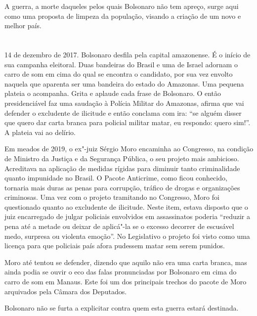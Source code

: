 A guerra, a morte daqueles pelos quais Bolsonaro não tem apreço, surge
aqui como uma proposta de limpeza da população, visando a criação de um
novo e melhor país.

\section*{}

14 de dezembro de 2017. Bolsonaro desfila pela capital amazonense. É o
início de sua campanha eleitoral. Duas bandeiras do Brasil e uma de
Israel adornam o carro de som em cima do qual se encontra o candidato,
por sua vez envolto naquela que aparenta ser uma bandeira do estado do
Amazonas. Uma pequena plateia o acompanha. Grita e aplaude cada frase de
Bolsonaro. O então presidenciável faz uma saudação à Polícia Militar do
Amazonas, afirma que vai defender o excludente de ilicitude e então
conclama com ira: ``se alguém disser que quero dar carta branca para
policial militar matar, eu respondo: quero sim!''. A plateia vai ao
delírio.

Em meados de 2019, o ex"-juiz Sérgio Moro encaminha ao Congresso, na
condição de Ministro da Justiça e da Segurança Pública, o seu projeto
mais ambicioso. Acreditava na aplicação de medidas rígidas para diminuir
tanto criminalidade quanto impunidade no Brasil. O Pacote Anticrime,
como ficou conhecido, tornaria mais duras as penas para corrupção,
tráfico de drogas e organizações criminosas. Uma vez com o projeto
tramitando no Congresso, Moro foi questionado quanto ao excludente de \label{moro}
ilicitude. Neste item, estava disposto que o juiz encarregado de julgar
policiais envolvidos em assassinatos poderia ``reduzir a pena até
a metade ou deixar de aplicá"-la se o excesso decorrer de escusável medo,
surpresa ou violenta emoção''. No Legislativo o projeto foi visto como
uma licença para que policiais país afora pudessem matar sem serem
punidos.

Moro até tentou se defender, dizendo que aquilo não era uma carta
branca, mas ainda podia se ouvir o eco das falas pronunciadas por
Bolsonaro em cima do carro de som em Manaus. Este foi um dos principais
trechos do pacote de Moro arquivados pela Câmara dos Deputados.

Bolsonaro não se furta a explicitar contra quem esta guerra estará
destinada.

\section*{}

